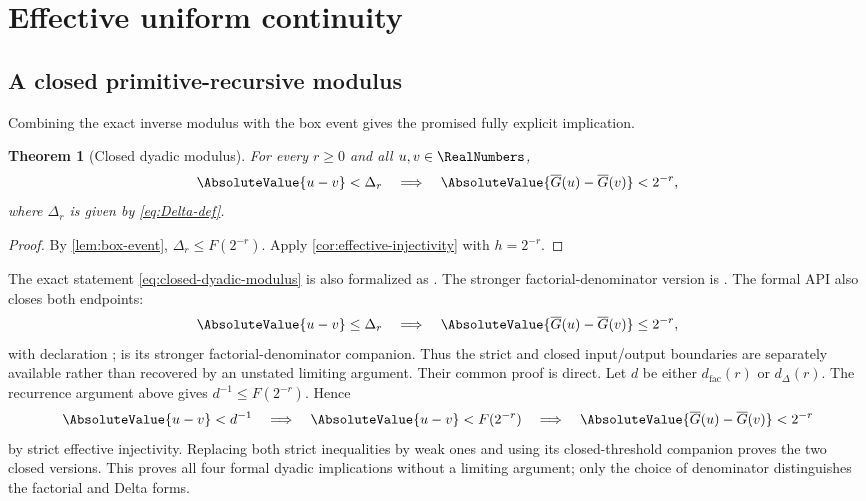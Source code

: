 \documentclass[11pt,oneside]{article}
\newtheorem{theorem}{Theorem}[section]
\theoremstyle{definition}
\theoremstyle{remark}
\numberwithin{equation}{section}
\newcommand{\InvT}{\overline G}
\begin{document}
\section{Effective uniform continuity}

\subsection{A closed primitive-recursive modulus}

Combining the exact inverse modulus with the box event gives the promised
fully explicit implication.

\begin{theorem}[Closed dyadic modulus]\label{thm:closed-dyadic-modulus}
For every $r\ge0$ and all $u,v\in\RealNumbers$,
\begin{equation}\label{eq:closed-dyadic-modulus}
 \AbsoluteValue{u-v}<\Delta_r
 \quad\Longrightarrow\quad
 \AbsoluteValue{\InvT(u)-\InvT(v)}<2^{-r},
\end{equation}
where $\Delta_r$ is given by \eqref{eq:Delta-def}.
\end{theorem}

\begin{proof}
By \cref{lem:box-event}, $\Delta_r\le F(2^{-r})$.  Apply
\cref{cor:effective-injectivity} with $h=2^{-r}$.
\end{proof}

The exact statement \eqref{eq:closed-dyadic-modulus} is also formalized as
.
The stronger factorial-denominator version is
.
The formal API also closes both endpoints:
\[
 \AbsoluteValue{u-v}\le\Delta_r
 \quad\Longrightarrow\quad
 \AbsoluteValue{\InvT(u)-\InvT(v)}\le2^{-r},
\]
with declaration
;
is its stronger factorial-denominator companion.  Thus the strict and closed
input/output boundaries are separately available rather than recovered by an
unstated limiting argument.  Their common proof is direct.  Let $d$ be either
$d_{\mathrm{fac}}(r)$ or $d_{\Delta}(r)$.  The recurrence argument above gives
$d^{-1}\le F(2^{-r})$.  Hence
\[
 \AbsoluteValue{u-v}<d^{-1}
 \quad\Longrightarrow\quad
 \AbsoluteValue{u-v}<F(2^{-r})
 \quad\Longrightarrow\quad
 \AbsoluteValue{\InvT(u)-\InvT(v)}<2^{-r}
\]
by strict effective injectivity.  Replacing both strict inequalities by weak
ones and using its closed-threshold companion proves the two closed versions.
This proves all four formal dyadic implications without a limiting argument;
only the choice of denominator distinguishes the factorial and Delta forms.
\end{document}
